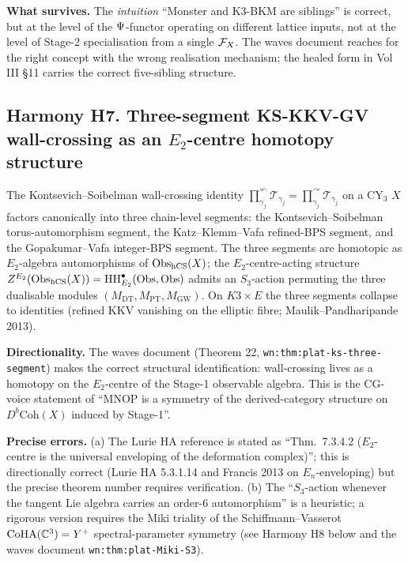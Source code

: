 \textbf{What survives.} The \emph{intuition} ``Monster and K3-BKM are
siblings'' is correct, but at the level of the $\Psi$-functor
operating on different lattice inputs, not at the level of Stage-2
specialisation from a single $\mathcal{F}_X$. The waves document reaches for
the right concept with the wrong realisation mechanism; the healed
form in Vol III \S11 carries the correct five-sibling structure.

\subsection{Harmony H7. Three-segment KS-KKV-GV wall-crossing as an
$E_2$-centre homotopy structure}
\label{wn:subsec:H7-wall-crossing}

\begin{theorem}
\ClaimStatusDirectionallyCorrect
\label{wn:thm:H7-wall-crossing}
The Kontsevich--Soibelman wall-crossing identity
$\prod^\curvearrowleft_{\gamma_j} \mathcal{T}_{\gamma_j}
= \prod^\curvearrowright_{\gamma_j} \mathcal{T}_{\gamma_j}$ on a CY$_3$
$X$ factors canonically into three chain-level segments: the
Kontsevich--Soibelman torus-automorphism segment, the
Katz--Klemm--Vafa refined-BPS segment, and the Gopakumar--Vafa
integer-BPS segment. The three segments are homotopic as
$E_2$-algebra automorphisms of $\mathrm{Obs}_{\mathrm{hCS}}(X)$; the
$E_2$-centre-acting structure
$Z^{E_2}(\mathrm{Obs}_{\mathrm{hCS}}(X)) = \mathrm{HH}^\bullet_{E_2}(\mathrm{Obs}, \mathrm{Obs})$ admits
an $S_3$-action permuting the three dualisable modules
$(M_{\mathrm{DT}}, M_{\mathrm{PT}}, M_{\mathrm{GW}})$.
On $K3 \times E$ the three segments collapse to identities (refined KKV
vanishing on the elliptic fibre; Maulik--Pandharipande 2013).
\end{theorem}

\textbf{Directionality.} The waves document (Theorem 22,
\verb|wn:thm:plat-ks-three-segment|) makes the correct structural
identification: wall-crossing lives as a homotopy on the $E_2$-centre
of the Stage-1 observable algebra. This is the CG-voice statement of
``MNOP is a symmetry of the derived-category structure on
$D^b\mathrm{Coh}(X)$ induced by Stage-1''.

\textbf{Precise errors.} (a) The Lurie $\mathrm{HA}$ reference is
stated as ``Thm.~7.3.4.2 ($E_2$-centre is the universal enveloping of
the deformation complex)''; this is directionally correct (Lurie HA
5.3.1.14 and Francis 2013 on $E_n$-enveloping) but the precise theorem
number requires verification. (b) The ``$S_3$-action whenever the
tangent Lie algebra carries an order-6 automorphism'' is a
heuristic; a rigorous version requires the Miki triality of the
Schiffmann--Vasserot $\mathrm{CoHA}(\mathbb{C}^3) = Y^+$ spectral-parameter symmetry
(see Harmony H8 below and the waves document
\verb|wn:thm:plat-Miki-S3|).

